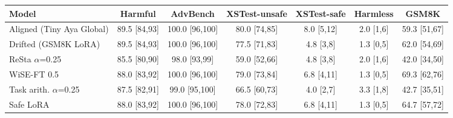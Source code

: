 \begin{tabular}{lcccccc}
\toprule
Model & Harmful & AdvBench & XSTest-unsafe & XSTest-safe & Harmless & GSM8K \\
\midrule
Aligned (Tiny Aya Global) & 89.5 \scriptsize{[84,93]} & 100.0 \scriptsize{[96,100]} & 80.0 \scriptsize{[74,85]} & 8.0 \scriptsize{[5,12]} & 2.0 \scriptsize{[1,6]} & 59.3 \scriptsize{[51,67]} \\
Drifted (GSM8K LoRA) & 89.5 \scriptsize{[84,93]} & 100.0 \scriptsize{[96,100]} & 77.5 \scriptsize{[71,83]} & 4.8 \scriptsize{[3,8]} & 1.3 \scriptsize{[0,5]} & 62.0 \scriptsize{[54,69]} \\
\midrule
ReSta $\alpha$=0.25 & 85.5 \scriptsize{[80,90]} & 98.0 \scriptsize{[93,99]} & 59.0 \scriptsize{[52,66]} & 4.8 \scriptsize{[3,8]} & 2.0 \scriptsize{[1,6]} & 42.0 \scriptsize{[34,50]} \\
WiSE-FT 0.5 & 88.0 \scriptsize{[83,92]} & 100.0 \scriptsize{[96,100]} & 79.0 \scriptsize{[73,84]} & 6.8 \scriptsize{[4,11]} & 1.3 \scriptsize{[0,5]} & 69.3 \scriptsize{[62,76]} \\
Task arith. $\alpha$=0.25 & 87.5 \scriptsize{[82,91]} & 99.0 \scriptsize{[95,100]} & 66.5 \scriptsize{[60,73]} & 4.0 \scriptsize{[2,7]} & 3.3 \scriptsize{[1,8]} & 42.7 \scriptsize{[35,51]} \\
Safe LoRA & 88.0 \scriptsize{[83,92]} & 100.0 \scriptsize{[96,100]} & 78.0 \scriptsize{[72,83]} & 6.8 \scriptsize{[4,11]} & 1.3 \scriptsize{[0,5]} & 64.7 \scriptsize{[57,72]} \\
\bottomrule
\end{tabular}
